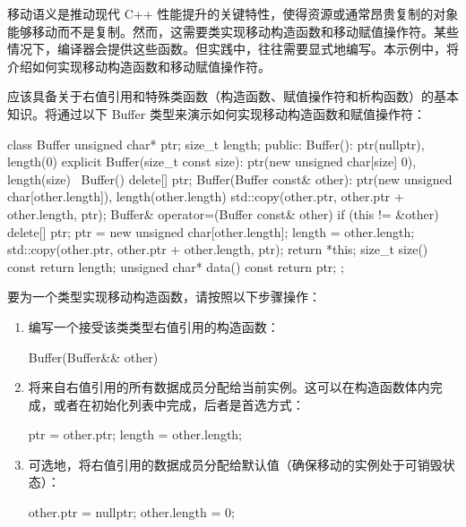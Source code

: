 移动语义是推动现代 C++ 性能提升的关键特性，使得资源或通常昂贵复制的对象能够移动而不是复制。然而，这需要类实现移动构造函数和移动赋值操作符。某些情况下，编译器会提供这些函数。但实践中，往往需要显式地编写。本示例中，将介绍如何实现移动构造函数和移动赋值操作符。


应该具备关于右值引用和特殊类函数（构造函数、赋值操作符和析构函数）的基本知识。将通过以下 Buffer 类型来演示如何实现移动构造函数和赋值操作符：

\begin{cpp}
class Buffer
{
    unsigned char* ptr;
    size_t length;
public:
    Buffer(): ptr(nullptr), length(0)
    {}
    explicit Buffer(size_t const size):
        ptr(new unsigned char[size] {0}), length(size)
    {}
    ~Buffer()
    {
        delete[] ptr;
    }
    Buffer(Buffer const& other):
        ptr(new unsigned char[other.length]),
    length(other.length)
    {
        std::copy(other.ptr, other.ptr + other.length, ptr);
    }
    Buffer& operator=(Buffer const& other)
    {
        if (this != &other)
        {
            delete[] ptr;
            ptr = new unsigned char[other.length];
            length = other.length;
            std::copy(other.ptr, other.ptr + other.length, ptr);
        }
        return *this;
    }
    size_t size() const { return length;}
    unsigned char* data() const { return ptr; }
};
\end{cpp}


要为一个类型实现移动构造函数，请按照以下步骤操作：

\begin{enumerate}
\item
编写一个接受该类类型右值引用的构造函数：

\begin{cpp}
Buffer(Buffer&& other)
{
}
\end{cpp}

\item
将来自右值引用的所有数据成员分配给当前实例。这可以在构造函数体内完成，或者在初始化列表中完成，后者是首选方式：

\begin{cpp}
ptr = other.ptr;
length = other.length;
\end{cpp}

\item
可选地，将右值引用的数据成员分配给默认值（确保移动的实例处于可销毁状态）：

\begin{cpp}
other.ptr = nullptr;
other.length = 0;
\end{cpp}
\end{enumerate}

